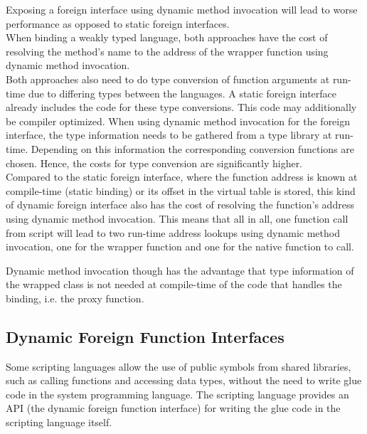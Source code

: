 Exposing a foreign interface using dynamic method invocation will lead to worse \linebreak performance as opposed to static foreign interfaces.\\
When binding a weakly typed language, both approaches have the cost of resolving the method's name to the address of the wrapper function using dynamic method invocation.\\
Both approaches also need to do type conversion of function arguments at run-time due to differing types between the languages. A static foreign interface already includes the code for these type conversions. This code may additionally be compiler optimized. When using dynamic method invocation for the foreign interface, the type information needs to be gathered from a type library at run-time. Depending on this information the corresponding conversion functions are chosen. Hence, the costs for type conversion are significantly higher.\\
Compared to the static foreign interface, where the function address is known at \linebreak compile-time (static binding) or its offset in the virtual table is stored, this kind of dynamic foreign interface also has the cost of resolving the function's address using dynamic method invocation. This means that all in all, one function call from script will lead to two run-time address lookups using dynamic method invocation, one for the wrapper function and one for the native function to call.

Dynamic method invocation though has the advantage that type information of the wrapped class is not needed at compile-time of the code that handles the binding, i.e. the proxy function.


\subsection{Dynamic Foreign Function Interfaces}
\label{sec:DynamicFFI}

Some scripting languages allow the use of public symbols from shared libraries, such as calling functions and accessing data types, without the need to write glue code in the system programming language. The scripting language provides an API (the dynamic foreign function interface) for writing the glue code in the scripting language itself.

